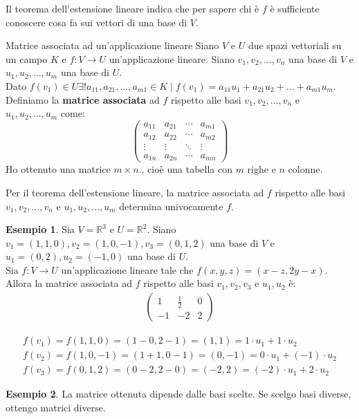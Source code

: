 \documentclass[a4paper]{article}
\theoremstyle{definition}
\newtheorem*{es}{Esempio}
\begin{document}
Il teorema dell'estensione lineare indica che per sapere chi è $f$ è sufficiente conoscere cosa fa sui vettori di una base di $V$.
\begin{deff}{Matrice associata ad un'applicazione lineare}{}
	Siano $V$ e $U$ due spazi vettoriali su un campo $K$ e $f: V \rightarrow U$ un'applicazione lineare.
	Siano $v_1, v_2, ..., v_n$ una base di $V$ e $u_1, u_2, ..., u_m$ una base di $U$. \\
	Dato $f(v_1) \in U \exists! a_{11}, a_{21}, ..., a_{m1} \in K \mid f(v_1) = a_{11}u_1 + a_{21}u_2 + ... + a_{m1}u_m$. \\
	Definiamo la \textbf{matrice associata} ad $f$ rispetto alle basi $v_1, v_2, ..., v_n$ e $u_1, u_2, ..., u_m$ come:
	\begin{equation*}
		\begin{pmatrix}
			a_{11} & a_{21} & \cdots & a_{m1} \\
			a_{12} & a_{22} & \cdots & a_{m2} \\
			\vdots & \vdots & \ddots & \vdots \\
			a_{1n} & a_{2n} & \cdots & a_{mn}
		\end{pmatrix}
	\end{equation*}
	Ho ottenuto una matrice $m \times n$., cioè una tabella con $m$ righe e $n$ colonne.
\end{deff}
Per il teorema dell'estensione lineare, la matrice associata ad $f$ rispetto alle basi $v_1, v_2, ..., v_n$ e $u_1, u_2, ..., u_m$ determina univocamente $f$.
\begin{es}
	Sia $V = \mathbb{R}^3$ e $U = \mathbb{R}^2$. Siano $v_1 = (1, 1, 0), v_2 = (1, 0, -1), v_3 = (0, 1, 2)$ una base di $V$ e $u_1 = (0, 2), u_2 = (-1, 0)$ una base di $U$. \\
	Sia $f: V \rightarrow U$ un'applicazione lineare tale che $f(x, y, z) = (x - z, 2y - x)$. \\
	Allora la matrice associata ad $f$ rispetto alle basi $v_1, v_2, v_3$ e $u_1, u_2$ è:
	\begin{align*}
		\begin{pmatrix}
			1  & \frac{1}{2} & 0 \\
			-1 & - 2         & 2
		\end{pmatrix}
	\end{align*}
\end{es}
\begin{align*}
	f(v_1) = f(1, 1, 0) = (1 - 0, 2 - 1) = (1, 1) = 1 \cdot u_1 + 1 \cdot u_2      \\
	f(v_2) = f(1, 0, -1) = (1 + 1, 0 - 1) = (0, -1) = 0 \cdot u_1 + (-1) \cdot u_2 \\
	f(v_3) = f(0, 1, 2) = (0 - 2, 2 - 0) = (-2, 2) = (-2) \cdot u_1 + 2 \cdot u_2
\end{align*}
\begin{es}
	La matrice ottenuta dipende dalle basi scelte. Se scelgo basi diverse, ottengo matrici diverse.
\end{es}
\end{document}
